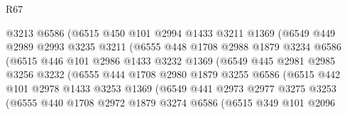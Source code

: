 \begin{lexlean}{R67}
\begin{coremodule}
                        @3213
                        @6586
                        (@6515
                          @450
                          @101
                          @2994
                          @1433
                          @3211
                          @1369
                          (@6549
                            @449
                            @2989
                            @2993
                            @3235
                            @3211
                            (@6555
                              @448
                              @1708
                              @2988
                              @1879
                              @3234
                              @6586
                              (@6515
                                @446
                                @101
                                @2986
                                @1433
                                @3232
                                @1369
                                (@6549
                                  @445
                                  @2981
                                  @2985
                                  @3256
                                  @3232
                                  (@6555
                                    @444
                                    @1708
                                    @2980
                                    @1879
                                    @3255
                                    @6586
                                    (@6515
                                      @442
                                      @101
                                      @2978
                                      @1433
                                      @3253
                                      @1369
                                      (@6549
                                        @441
                                        @2973
                                        @2977
                                        @3275
                                        @3253
                                        (@6555
                                          @440
                                          @1708
                                          @2972
                                          @1879
                                          @3274
                                          @6586
                                          (@6515
                                            @349
                                            @101
                                            @2096

\end{coremodule}
\end{lexlean}

